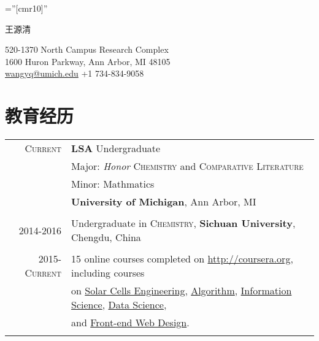 \documentclass[letterpaper,10pt]{ctexart}
\begin{document}

\pagestyle{empty} %

\font\fb=''[cmr10]'' %

\par{\centering
		{ \Huge  王源清
	}\bigskip\par}

\begin{center}


520-1370 North Campus Research Complex\\
1600 Huron Parkway, Ann Arbor, MI 48105\\
\href{mailto:wangyq@umich.edu}{wangyq@umich.edu} +1 734-834-9058\\
\end{center}

\section{教育经历}
\begin{tabular}{rl}	
 \textsc{Current}  & \textbf{LSA} Undergraduate \\ & Major:  \textit{Honor} \textsc{Chemistry} and \textsc{Comparative Literature} \\
 & Minor: Mathmatics\\
 & \textbf{University of Michigan}, Ann Arbor, MI
\\&\\
2014-2016& Undergraduate in \textsc{Chemistry},  \normalsize\textbf{Sichuan University}, Chengdu, China\\&\\
2015-\textsc{Current} & 15 online courses completed on \url{http://coursera.org}, including courses \\ & on \href{https://www.coursera.org/account/accomplishments/certificate/KQ9HQDJD6Q6D}{Solar Cells Engineering},
\href{https://www.coursera.org/account/accomplishments/certificate/NUVY8VE5ZERV}{Algorithm},
\href{https://www.coursera.org/account/accomplishments/certificate/PR3V2KY7JTN3}{Information Science},
\href{https://www.coursera.org/account/accomplishments/certificate/79CSDQ9U32BR}{Data Science}, \\ & and
\href{https://www.coursera.org/account/accomplishments/certificate/FQ235GTZ42AE}{Front-end Web Design}. \\\\ %

\end{tabular}
\end{document}
